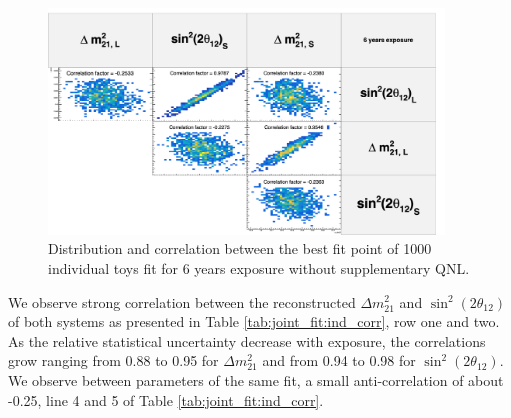 \documentclass[../main.tex]{subfiles}
\begin{document}
\begin{figure}[ht]
  \centering
  \includegraphics[height=6cm]{images/joint_fit/stat_tests/chi2_ind_corr_6y.png}
  \caption{Distribution and correlation between the best fit point of 1000 individual toys fit for 6 years exposure without supplementary QNL.}
  \label{fig:joint_fit:chi2_ind:corr:6y}
\end{figure}


We observe strong correlation between the reconstructed $\Delta m^2_{21}$ and $\sin^2(2\theta_{12})$ of both systems as presented in Table \ref{tab:joint_fit:ind_corr}, row one and two. As the relative statistical uncertainty decrease with exposure, the correlations grow ranging from 0.88 to 0.95 for $\Delta m^2_{21}$ and from 0.94 to 0.98 for $\sin^2(2\theta_{12})$. We observe between parameters of the same fit, a small anti-correlation of about -0.25, line 4 and 5 of Table \ref{tab:joint_fit:ind_corr}.

\end{document}
